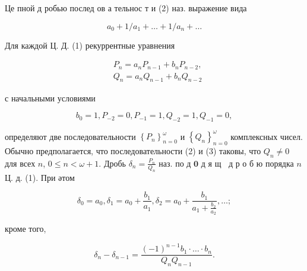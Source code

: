 \documentclass[10pt]{article}
\begin{document}
Це пной д робью послед ов а тельнос т и (2) наз. выражение вида



\[

a_{0}+1 / a_{1}+\ldots+1 / a_{n}+\ldots

\]



Для каждой Ц. Д. (1) рекуррентные уравнения



\[

\begin{aligned}

& P_{n}=a_{n} P_{n-1}+b_{n} P_{n-2}, \\

& Q_{n}=a_{n} Q_{n-1}+b_{n} Q_{n-2}

\end{aligned}

\]



с начальными условиями



\[

b_{0}=1, P_{-2}=0, P_{-1}=1, Q_{-2}=1, Q_{-1}=0,

\]



определяют две последовательности $\left\{P_{n}\right\}_{n=0}^{\omega}$ и $\left\{Q_{n}\right\}_{n=0}^{\omega}$ комплексных чисел. Обычно предполагается, что последовательности (2) и (3) таковы, что $Q_{n} \neq 0$ для всех $n$, $0 \leqslant n<\omega+1$. Дробь $\delta_{n}=\frac{P_{n}}{Q_{n}}$ наз. по д $\mathbf{0}$ д я щ $\mathbf{~}$ д р о б ю порядка $n$ Ц. д. (1). При әтом



\[

\delta_{0}=a_{0}, \delta_{1}=a_{0}+\frac{b_{1}}{a_{1}}, \delta_{2}=a_{0}+\frac{b_{1}}{a_{1}+\frac{b_{2}}{a_{2}}}, \ldots ;

\]



кроме того,



\[

\delta_{n}-\delta_{n-1}=\frac{(-1)^{n-1} b_{1} \cdot \ldots \cdot b_{n}}{Q_{n} Q_{n-1}} .

\]
\end{document}
